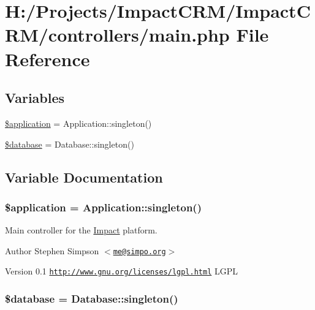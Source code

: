 \hypertarget{main_8php}{
\section{H:/Projects/ImpactCRM/ImpactCRM/controllers/main.php File Reference}
\label{main_8php}
}
\subsection*{Variables}
\begin{DoxyCompactItemize}
\item 
\hyperlink{main_8php_a537fa9b460dddc2a67074faab810398a}{\$application} = Application::singleton()
\item 
\hyperlink{main_8php_a7691c0162d89de0b6ba47edcd8ba8878}{\$database} = Database::singleton()
\end{DoxyCompactItemize}


\subsection{Variable Documentation}
\hypertarget{main_8php_a537fa9b460dddc2a67074faab810398a}{
\subsubsection[{\$application}]{\setlength{\rightskip}{0pt plus 5cm}\$application = Application::singleton()}}
\label{main_8php_a537fa9b460dddc2a67074faab810398a}
Main controller for the \hyperlink{namespaceImpact}{Impact} platform.

\begin{DoxyAuthor}{Author}
Stephen Simpson $<$\href{mailto:me@simpo.org}{\tt me@simpo.org}$>$ 
\end{DoxyAuthor}
\begin{DoxyVersion}{Version}
0.1  \href{http://www.gnu.org/licenses/lgpl.html}{\tt http://www.gnu.org/licenses/lgpl.html} LGPL 
\end{DoxyVersion}
\hypertarget{main_8php_a7691c0162d89de0b6ba47edcd8ba8878}{
\subsubsection[{\$database}]{\setlength{\rightskip}{0pt plus 5cm}\$database = Database::singleton()}}
\label{main_8php_a7691c0162d89de0b6ba47edcd8ba8878}
